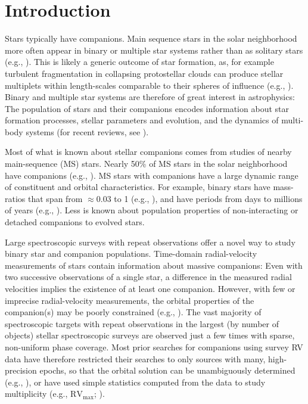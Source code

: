 \documentclass[modern, letterpaper]{aastex62}
\begin{document}

\section{Introduction} \label{sec:intro}

Stars typically have companions.
Main sequence stars in the solar neighborhood more often appear in binary or
multiple star systems rather than as solitary stars (e.g.,
\citealt{Duquennoy:1991,Raghavan:2010,Tokovinin:2014,Moe:2017}).
This is likely a generic outcome of star formation, as, for example turbulent
fragmentation in collapsing protostellar clouds can produce stellar multiplets
within length-scales comparable to their spheres of influence (e.g.,
\citealt{Raskutti:2016}).
Binary and multiple star systems are therefore of great interest in
astrophysics: The population of stars and their companions encodes information
about star formation processes, stellar parameters and evolution, and the
dynamics of multi-body systems (for recent reviews, see
\citealt{Duchene:2013,Moe:2017}).

Most of what is known about stellar companions comes from studies of
nearby main-sequence (MS) stars.
Nearly 50\% of MS stars in the solar neighborhood have companions
(e.g., \citealt{Tokovinin:2014}).
MS stars with companions have a large dynamic range of constituent and orbital
characteristics.
For example, binary stars have mass-ratios that span from $\approx 0.03$
to 1 (e.g., \citealt{Kraus:2008}), and have periods from days to
millions of years (e.g., \citealt{Raghavan:2010}).
Less is known about population properties of non-interacting or detached
companions to evolved stars.

Large spectroscopic surveys with repeat observations offer a novel way to study
binary star and companion populations.
Time-domain radial-velocity measurements of stars contain information about
massive companions: Even with two successive observations of a single star, a
difference in the measured radial velocities implies the existence of at least
one companion.
However, with few or imprecise radial-velocity measurements, the orbital
properties of the companion(s) may be poorly constrained (e.g.,
\citealt{Price-Whelan:2017}).
The vast majority of spectroscopic targets with repeat observations in the
largest (by number of objects) stellar spectroscopic surveys are observed just a
few times with sparse, non-uniform phase coverage.
Most prior searches for companions using survey RV data have therefore
restricted their searches to only sources with many, high-precision epochs, so
that the orbital solution can be unambiguously determined (e.g.,
\citealt{Troup:2016}), or have used simple statistics computed from the data to
study multiplicity (e.g., $\textrm{RV}_\textrm{max}$; \citealt{Badenes:2017}).
\end{document}
